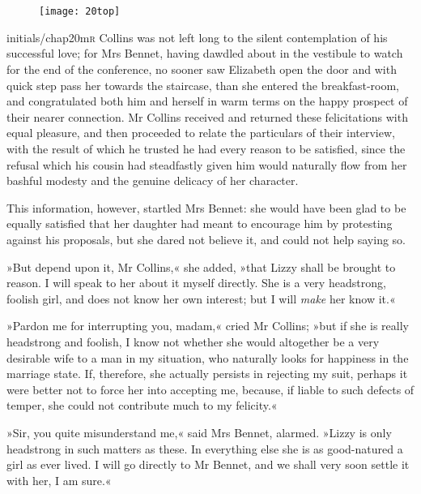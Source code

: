\chapter[Chapter \thechapter]{}
\begin{figure}[t!]
\centering
\texttt{[image: 20top]}
\end{figure}

\lettrine[lines=6,image=true]{initials/chap20m}{r}  Collins was not left long to the silent contemplation of his successful love; for Mrs Bennet, having dawdled about in the vestibule to watch for the end of the conference, no sooner saw Elizabeth open the door and with quick step pass her towards the staircase, than she entered the breakfast-room, and congratulated both him and herself in warm terms on the happy prospect of their nearer connection. Mr Collins received and returned these felicitations with equal pleasure, and then proceeded to relate the particulars of their interview, with the result of which he trusted he had every reason to be satisfied, since the refusal which his cousin had steadfastly given him would naturally flow from her bashful modesty and the genuine delicacy of her character.

This information, however, startled Mrs Bennet: she would have been glad to be equally satisfied that her daughter had meant to encourage him by protesting against his proposals, but she dared not believe it, and could not help saying so.

»But depend upon it, Mr Collins,« she added, »that Lizzy shall be brought to reason. I will speak to her about it myself directly. She is a very headstrong, foolish girl, and does not know her own interest; but I will \textit{make} her know it.«

»Pardon me for interrupting you, madam,« cried Mr Collins; »but if she is really headstrong and foolish, I know not whether she would altogether be a very desirable wife to a man in my situation, who naturally looks for happiness in the marriage state. If, therefore, she actually persists in rejecting my suit, perhaps it were better not to force her into accepting me, because, if liable to such defects of temper, she could not contribute much to my felicity.«

»Sir, you quite misunderstand me,« said Mrs Bennet, alarmed. »Lizzy is only headstrong in such matters as these. In everything else she is as good-natured a girl as ever lived. I will go directly to Mr Bennet, and we shall very soon settle it with her, I am sure.«

